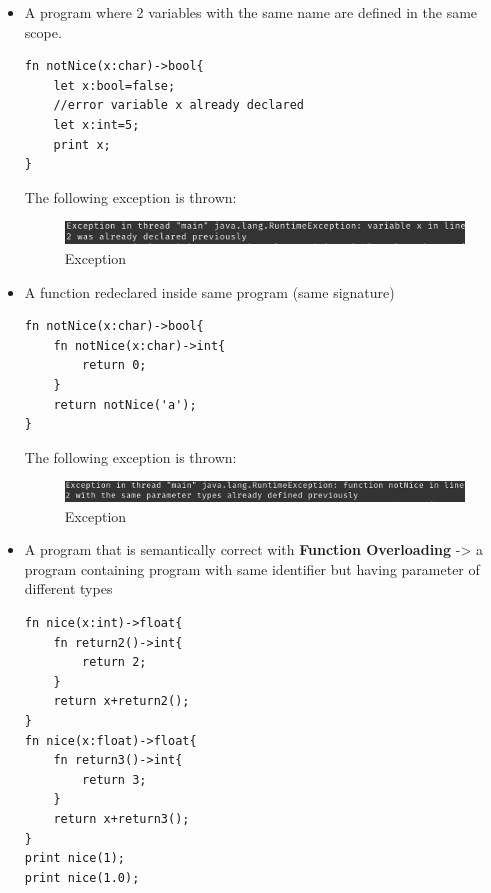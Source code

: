 \begin{itemize}
	\item A program where 2 variables with the same name are defined in the same scope.
	      	      	          
	      \begin{lstlisting}[basicstyle=\tiny,caption=Program 6]
fn notNice(x:char)->bool{
	let x:bool=false;
	//error variable x already declared
	let x:int=5;
	print x;
}

	      \end{lstlisting}
	      	      	      
	      The following exception is thrown:
	      \begin{figure}[H]
	      	\centering
	      	\includegraphics[scale=0.7]{Task345/images/errorVariableRedclar.png}
	      	\caption{Exception}
	      	\label{fig:exception function not expected to return}
	      \end{figure}
	      	      	      
	\item A function redeclared inside same program (same signature)
	      	      	          
	      	      	          
	      	      	          
	      	      	      
	      \begin{lstlisting}[basicstyle=\tiny,caption=Program 7]
fn notNice(x:char)->bool{
	fn notNice(x:char)->int{
		return 0;
	}
	return notNice('a');
}
	      \end{lstlisting}
	      	      	      
	      	      	      
	      The following exception is thrown:
	      \begin{figure}[H]
	      	\centering
	      	\includegraphics[scale=0.7]{Task345/images/errorFuncRedclar.png}
	      	\caption{Exception}
	      	\label{fig:exception function not expected to return}
	      \end{figure}
	      	      	          
	\item A program that is semantically correct with \textbf{Function Overloading} -> a program containing program with same identifier but having parameter of different types
	      \begin{lstlisting}[basicstyle=\tiny,caption=Program 8       ]
fn nice(x:int)->float{
	fn return2()->int{
		return 2;
	}
	return x+return2();
}
fn nice(x:float)->float{
	fn return3()->int{
		return 3;
	}
	return x+return3();
}
print nice(1);
print nice(1.0);
	      \end{lstlisting}
	      	      	      

\end{itemize}
